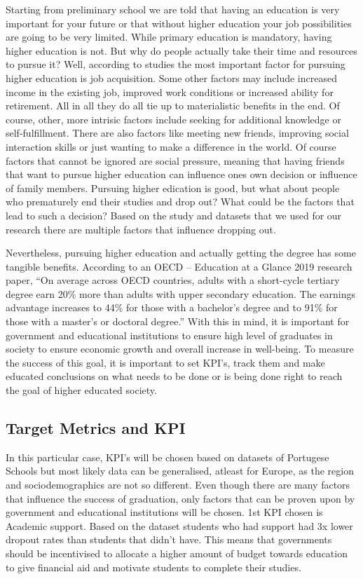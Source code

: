 \documentclass[
  letterpaper,
  DIV=11,
  numbers=noendperiod]{scrartcl}
\begin{document}
Starting from preliminary school we are told that having an education is
very important for your future or that without higher education your job
possibilities are going to be very limited. While primary education is
mandatory, having higher education is not. But why do people actually
take their time and resources to pursue it? Well, according to studies
the most important factor for pursuing higher education is job
acquisition. Some other factors may include increased income in the
existing job, improved work conditions or increased ability for
retirement. All in all they do all tie up to materialistic benefits in
the end. Of course, other, more intrisic factors include seeking for
additional knowledge or self-fulfillment. There are also factors like
meeting new friends, improving social interaction skills or just wanting
to make a difference in the world. Of course factors that cannot be
ignored are social pressure, meaning that having friends that want to
pursue higher education can influence ones own decision or influence of
family members. Pursuing higher edication is good, but what about people
who prematurely end their studies and drop out? What could be the
factors that lead to such a decision? Based on the study and datasets
that we used for our research there are multiple factors that influence
dropping out.

Nevertheless, pursuing higher education and actually getting the degree
has some tangible benefits. According to an OECD -- Education at a
Glance 2019 research paper, \enquote{On average across OECD countries,
adults with a short-cycle tertiary degree earn 20\% more than adults
with upper secondary education. The earnings advantage increases to 44\%
for those with a bachelor's degree and to 91\% for those with a master's
or doctoral degree.} With this in mind, it is important for government
and educational institutions to ensure high level of graduates in
society to ensure economic growth and overall increase in well-being. To
measure the success of this goal, it is important to set KPI's, track
them and make educated conclusions on what needs to be done or is being
done right to reach the goal of higher educated society.

\hypertarget{target-metrics-and-kpi}{%
\subsection{Target Metrics and KPI}\label{target-metrics-and-kpi}}

In this particular case, KPI's will be chosen based on datasets of
Portugese Schools but most likely data can be generalised, atleast for
Europe, as the region and sociodemographics are not so different. Even
though there are many factors that influence the success of graduation,
only factors that can be proven upon by government and educational
institutions will be chosen. 1st KPI chosen is Academic support. Based
on the dataset students who had support had 3x lower dropout rates than
students that didn't have. This means that governments should be
incentivised to allocate a higher amount of budget towards education to
give financial aid and motivate students to complete their studies.
\end{document}
